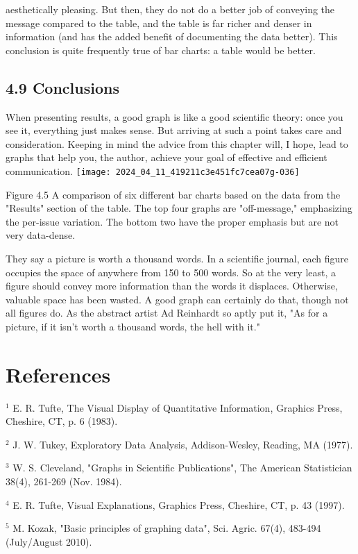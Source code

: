 aesthetically pleasing. But then, they do not do a better job of conveying the message compared to the table, and the table is far richer and denser in information (and has the added benefit of documenting the data better). This conclusion is quite frequently true of bar charts: a table would be better.

\subsection*{4.9 Conclusions}
When presenting results, a good graph is like a good scientific theory: once you see it, everything just makes sense. But arriving at such a point takes care and consideration. Keeping in mind the advice from this chapter will, I hope, lead to graphs that help you, the author, achieve your goal of effective and efficient communication.
\texttt{[image: 2024\_04\_11\_419211c3e451fc7cea07g-036]}

Figure 4.5 A comparison of six different bar charts based on the data from the "Results" section of the table. The top four graphs are "off-message," emphasizing the per-issue variation. The bottom two have the proper emphasis but are not very data-dense.

They say a picture is worth a thousand words. In a scientific journal, each figure occupies the space of anywhere from 150 to 500 words. So at the very least, a figure should convey more information than the words it displaces. Otherwise, valuable space has been wasted. A good graph can certainly do that, though not all figures do. As the abstract artist Ad Reinhardt so aptly put it, "As for a picture, if it isn't worth a thousand words, the hell with it."

\section*{References}
${ }^{1}$ E. R. Tufte, The Visual Display of Quantitative Information, Graphics Press, Cheshire, CT, p. 6 (1983).

${ }^{2}$ J. W. Tukey, Exploratory Data Analysis, Addison-Wesley, Reading, MA (1977).

${ }^{3}$ W. S. Cleveland, "Graphs in Scientific Publications", The American Statistician 38(4), 261-269 (Nov. 1984).

${ }^{4}$ E. R. Tufte, Visual Explanations, Graphics Press, Cheshire, CT, p. 43 (1997).

${ }^{5}$ M. Kozak, "Basic principles of graphing data", Sci. Agric. 67(4), 483-494 (July/August 2010).

